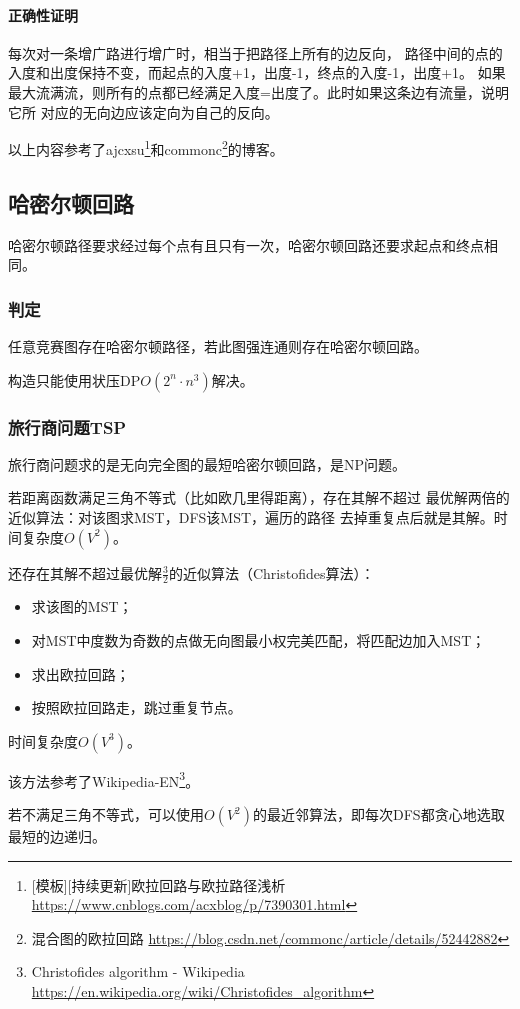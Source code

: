 \paragraph{正确性证明} 每次对一条增广路进行增广时，相当于把路径上所有的边反向，
路径中间的点的入度和出度保持不变，而起点的入度+1，出度-1，终点的入度-1，出度+1。
如果最大流满流，则所有的点都已经满足入度=出度了。此时如果这条边有流量，说明它所
对应的无向边应该定向为自己的反向。

以上内容参考了ajcxsu\footnote{[模板][持续更新]欧拉回路与欧拉路径浅析
    \url{https://www.cnblogs.com/acxblog/p/7390301.html}
}和commonc\footnote{混合图的欧拉回路
    \url{https://blog.csdn.net/commonc/article/details/52442882}
}的博客。
\subsection{哈密尔顿回路}
哈密尔顿路径要求经过每个点有且只有一次，哈密尔顿回路还要求起点和终点相同。

\subsubsection{判定}
\begin{theorem}
    任意竞赛图存在哈密尔顿路径，若此图强连通则存在哈密尔顿回路。
\end{theorem}

构造只能使用状压DP$O(2^n\cdot n^3)$解决。
\subsubsection{旅行商问题TSP}
旅行商问题求的是无向完全图的最短哈密尔顿回路，是NP问题。

若距离函数满足三角不等式（比如欧几里得距离），存在其解不超过
最优解两倍的近似算法：对该图求MST，DFS该MST，遍历的路径
去掉重复点后就是其解。时间复杂度$O(V^2)$。

还存在其解不超过最优解$\frac{3}{2}$的近似算法（Christofides算法）：
\begin{itemize}
    \item 求该图的MST；
    \item 对MST中度数为奇数的点做无向图最小权完美匹配，将匹配边加入MST；
    \item 求出欧拉回路；
    \item 按照欧拉回路走，跳过重复节点。
\end{itemize}
时间复杂度$O(V^3)$。

该方法参考了Wikipedia-EN\footnote{Christofides algorithm - Wikipedia\\
    \url{https://en.wikipedia.org/wiki/Christofides\_algorithm}
}。

若不满足三角不等式，可以使用$O(V^2)$的最近邻算法，即每次DFS都贪心地选取
最短的边递归。
